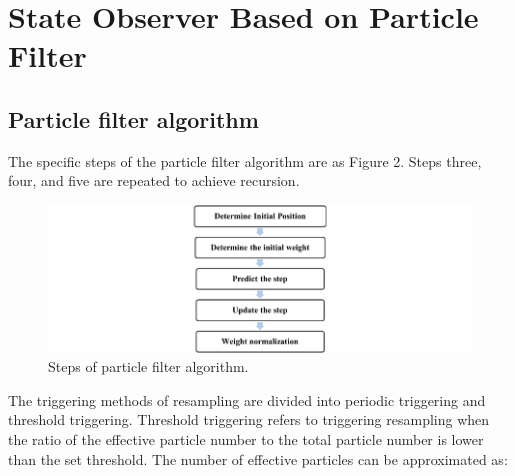 \section{State Observer Based on Particle Filter}

\subsection{Particle filter algorithm}

The specific steps of the particle filter algorithm are as Figure 2. Steps three, four, and five are repeated to achieve recursion.

\begin{figure}
    \centering
    
    \includegraphics{Sensor_Fusion_pictures/figure2.png}
    \caption{Steps of particle filter algorithm.}
    \label{stepsOfAlgorithm}
\end{figure}

The triggering methods of resampling are divided into periodic triggering and threshold triggering. Threshold triggering refers to triggering resampling when the ratio of the effective particle number to the total particle number is lower than the set threshold. The number of effective particles can be approximated as:

\begin{equation}
    
\end{equation}
